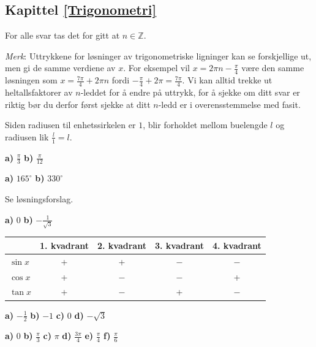 %


\usepackage{xr}



\subsection*{Kapittel \ref{Trigonometri}}	
\footnotesize
For alle svar tas det for gitt at $ n\in \mathbb{Z} $.

\textsl{Merk}: Uttrykkene for løsninger av trigonometriske ligninger kan se forskjellige ut, men gi de samme verdiene av $ x $. For eksempel vil $ {x= 2\pi n-\frac{\pi}{4}} $ være den samme løsningen som $ {x = \frac{7\pi}{4}+2\pi n} $ fordi $ {-\frac{\pi}{4}+2\pi = \frac{7\pi}{4}}$. Vi kan alltid trekke ut heltallsfaktorer av $ n $-leddet for å endre på uttrykk, for å sjekke om ditt svar er riktig bør du derfor først sjekke at ditt $ n $-ledd er i overensstemmelse med fasit.

Siden radiusen til enhetssirkelen er $ 1 $, blir forholdet mellom buelengde $ l $ og radiusen lik $ \frac{l}{1}=l $.

 \textbf{a)} $ \frac{\pi}{3} $ \textbf{b)} $ \frac{\pi}{12} $

 \textbf{a)} $ 165^\circ $ \textbf{b)} $ 330^\circ $

 Se løsningsforslag.

 \textbf{a)} $ 0  $ \textbf{b)} $- \frac{1}{\sqrt{3}} $
\newpage
{}\\
\begin{tabular}{@{}l|c| c| c|c|}
	
	&1. kvadrant & 2. kvadrant & 3. kvadrant & 4. kvadrant\\ \hline
	$ \sin x $& +& +& $ - $&$ - $\\ \hline
	$ \cos x $& +& $ - $& $ - $&+\\ \hline
	$ \tan x $& +& $ - $& +&$ - $\\\hline
\end{tabular}\vsk

\textbf{a)} $ -\frac{1}{2} $ \textbf{b)} $ -1 $ \textbf{c)} $ 0 $ \textbf{d)} $ -\sqrt{3} $

\textbf{a)} 0 \textbf{b)} $ \frac{\pi}{3} $ \textbf{c)} $ \pi $
\textbf{d)} $ \frac{3\pi}{4} $ \textbf{e)} $ \frac{\pi}{4} $ 
\textbf{f)} $ \frac{\pi}{6} $

